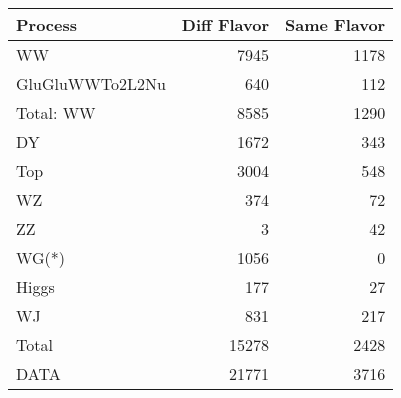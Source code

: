 \begin{table}[ht]
	\centering
\begin{tabular}{lrr}

         Process &  Diff Flavor &  Same Flavor \\
		\hline
              WW &         7945 &         1178 \\
 GluGluWWTo2L2Nu &          640 &          112 \\
\hline
       Total: WW &         8585 &         1290 \\
              DY &         1672 &          343 \\
             Top &         3004 &          548 \\
              WZ &          374 &           72 \\
              ZZ &            3 &           42 \\
           WG(*) &         1056 &            0 \\
           Higgs &          177 &           27 \\
              WJ &          831 &          217 \\
\hline
           Total &        15278 &         2428 \\
            DATA &        21771 &         3716 \\


\end{tabular}

\end{table}